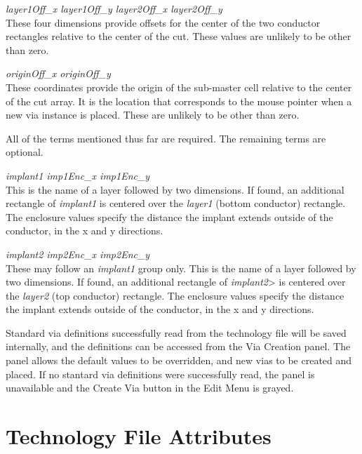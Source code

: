 \begin{description}
\item{\it layer1Off\_x layer1Off\_y layer2Off\_x layer2Off\_y}\\
These four dimensions provide offsets for the center of the two
conductor rectangles relative to the center of the cut.  These values
are unlikely to be other than zero.

\item{\it originOff\_x originOff\_y}\\
These coordinates provide the origin of the sub-master cell relative
to the center of the cut array.  It is the location that corresponds
to the mouse pointer when a new via instance is placed.  These are
unlikely to be other than zero.
\end{description}

All of the terms mentioned thus far are required.  The remaining terms
are optional.

\begin{description}
\item{\it implant1 imp1Enc\_x imp1Enc\_y}\\
This is the name of a layer followed by two dimensions.  If found, an
additional rectangle of {\it implant1} is centered over the {\it
layer1} (bottom conductor) rectangle.  The enclosure values specify
the distance the implant extends outside of the conductor, in the x
and y directions.

\item{\it implant2 imp2Enc\_x imp2Enc\_y}\\
These may follow an {\it implant1} group only.  This is the name of a
layer followed by two dimensions.  If found, an additional rectangle
of {\it implant2}> is centered over the {\it layer2} (top conductor)
rectangle.  The enclosure values specify the distance the implant
extends outside of the conductor, in the x and y directions.
\end{description}

Standard via definitions successfully read from the technology file
will be saved internally, and the definitions can be accessed from the
{\cb Via Creation} panel.  The panel allows the default values to be
overridden, and new vias to be created and placed.  If no stantard via
definitions were successfully read, the panel is unavailable and the
{\cb Create Via} button in the {\cb Edit Menu} is grayed.


\section{Technology File Attributes}
\label{techattr}

